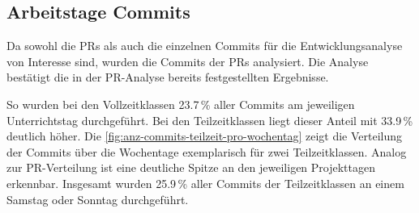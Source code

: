 \subsection{Arbeitstage Commits}
Da sowohl die PRs als auch die einzelnen Commits für die Entwicklungsanalyse von Interesse sind, wurden die Commits der PRs analysiert.
Die Analyse bestätigt die in der PR-Analyse bereits festgestellten Ergebnisse.

So wurden bei den Vollzeitklassen 23.7\,\% aller Commits am jeweiligen Unterrichtstag durchgeführt. Bei den Teilzeitklassen liegt dieser Anteil mit 33.9\,\% deutlich höher. Die \autoref{fig:anz-commits-teilzeit-pro-wochentag} zeigt die Verteilung der Commits über die Wochentage exemplarisch für zwei Teilzeitklassen. Analog zur PR-Verteilung ist eine deutliche Spitze an den jeweiligen Projekttagen erkennbar. Insgesamt wurden 25.9\,\% aller Commits der Teilzeitklassen an einem Samstag oder Sonntag durchgeführt.

